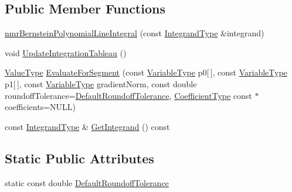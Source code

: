 \subsection*{Public Member Functions}
\begin{DoxyCompactItemize}
\item 
\hyperlink{classnmr_bernstein_polynomial_line_integral_a792ce0eb930e6e952b0d6db4374b4854}{nmr\-Bernstein\-Polynomial\-Line\-Integral} (const \hyperlink{classnmr_bernstein_polynomial_line_integral_a5c7945eacbf7d3d225de9d11bbac138c}{Integrand\-Type} \&integrand)
\item 
void \hyperlink{classnmr_bernstein_polynomial_line_integral_ace2bdff4c8e8c70d7e5a73284225ae49}{Update\-Integration\-Tableau} ()
\item 
\hyperlink{classnmr_bernstein_polynomial_line_integral_ab1d3f80540e0791f359e53b3ef074a86}{Value\-Type} \hyperlink{classnmr_bernstein_polynomial_line_integral_aa0715104b8922688ed16042b410f7d82}{Evaluate\-For\-Segment} (const \hyperlink{classnmr_bernstein_polynomial_line_integral_a229f7cb4c93c33c1b2a3de23d4f3460b}{Variable\-Type} p0\mbox{[}$\,$\mbox{]}, const \hyperlink{classnmr_bernstein_polynomial_line_integral_a229f7cb4c93c33c1b2a3de23d4f3460b}{Variable\-Type} p1\mbox{[}$\,$\mbox{]}, const \hyperlink{classnmr_bernstein_polynomial_line_integral_a229f7cb4c93c33c1b2a3de23d4f3460b}{Variable\-Type} gradient\-Norm, const double roundoff\-Tolerance=\hyperlink{classnmr_bernstein_polynomial_line_integral_acd99dd062ecb011d518908d73b5f6c80}{Default\-Roundoff\-Tolerance}, \hyperlink{classnmr_bernstein_polynomial_line_integral_a0dc7480d6f60af6d3d8da6e32444edf7}{Coefficient\-Type} const $\ast$coefficients=N\-U\-L\-L)
\item 
const \hyperlink{classnmr_bernstein_polynomial_line_integral_a5c7945eacbf7d3d225de9d11bbac138c}{Integrand\-Type} \& \hyperlink{classnmr_bernstein_polynomial_line_integral_a77d948c760c2886f75ac0b9ad5855e8d}{Get\-Integrand} () const 
\end{DoxyCompactItemize}
\subsection*{Static Public Attributes}
\begin{DoxyCompactItemize}
\item 
static const double \hyperlink{classnmr_bernstein_polynomial_line_integral_acd99dd062ecb011d518908d73b5f6c80}{Default\-Roundoff\-Tolerance}
\end{DoxyCompactItemize}
